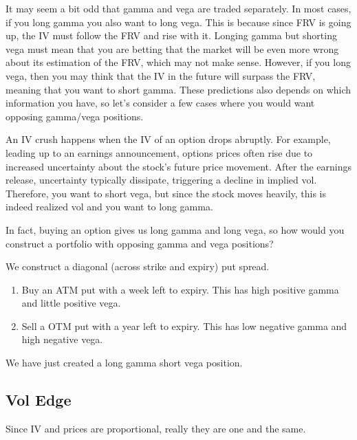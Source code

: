 \documentclass{article}
\begin{document}
    It may seem a bit odd that gamma and vega are traded separately. In most cases, if you long gamma you also want to long vega. This is because since FRV is going up, the IV must follow the FRV and rise with it. Longing gamma but shorting vega must mean that you are betting that the market will be even more wrong about its estimation of the FRV, which may not make sense. However, if you long vega, then you may think that the IV in the future will surpass the FRV, meaning that you want to short gamma. These predictions also depends on which information you have, so let's consider a few cases where you would want opposing gamma/vega positions.

    \begin{example}[IV Crush]
      \label{ex:iv-crush}
      An IV crush happens when the IV of an option drops abruptly. For example, leading up to an earnings announcement, options prices often rise due to increased uncertainty about the stock's future price movement. After the earnings release, uncertainty typically dissipate, triggering a decline in implied vol. Therefore, you want to short vega, but since the stock moves heavily, this is indeed realized vol and you want to long gamma.
    \end{example}

    In fact, buying an option gives us long gamma and long vega, so how would you construct a portfolio with opposing gamma and vega positions?

    \begin{example}
      \label{ex:opposite-gamma-and-vega-positions}
      We construct a diagonal (across strike and expiry) put spread.
      \begin{enumerate}
        \item Buy an ATM put with a week left to expiry. This has high positive gamma and little positive vega.
        \item Sell a OTM put with a year left to expiry. This has low negative gamma and high negative vega.
      \end{enumerate}
      We have just created a long gamma short vega position.
    \end{example}

  \subsection{Vol Edge}

    Since IV and prices are proportional, really they are one and the same. 
\end{document}
